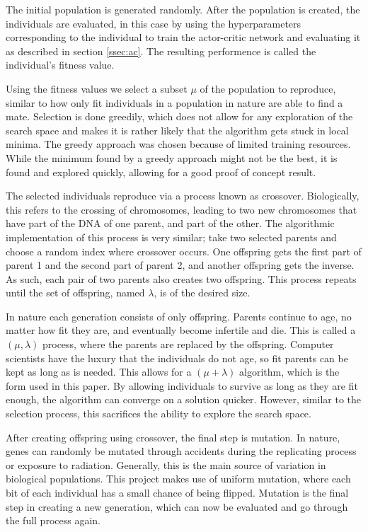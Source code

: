 \documentclass{article}
\begin{document}
The initial population is generated randomly. After the population is created, the individuals are evaluated, in this case by using the hyperparameters corresponding to the individual to train the actor-critic network and evaluating it as described in section \ref{ssec:ac}. The resulting performence is called the individual's fitness value. 

Using the fitness values we select a subset $\mu$ of the population to reproduce, similar to how only fit individuals in a population in nature are able to find a mate. Selection is done greedily, which does not allow for any exploration of the search space and makes it is rather likely that the algorithm gets stuck in local minima. The greedy approach was chosen because of limited training resources. While the minimum found by a greedy approach might not be the best, it is found and explored quickly, allowing for a good proof of concept result. 

The selected individuals reproduce via a process known as crossover. Biologically, this refers to the crossing of chromosomes, leading to two new chromosomes that have part of the DNA of one parent, and part of the other. The algorithmic implementation of this process is very similar; take two selected parents and choose a random index where crossover occurs. One offspring gets the first part of parent 1 and the second part of parent 2, and another offspring gets the inverse. As such, each pair of two parents also creates two offspring. This process repeats until the set of offspring, named $\lambda$, is of the desired size. 

In nature each generation consists of only offspring. Parents continue to age, no matter how fit they are, and eventually become infertile and die. This is called a $(\mu, \lambda)$ process, where the parents are replaced by the offspring. Computer scientists have the luxury that the individuals do not age, so fit parents can be kept as long as is needed. This allows for a $(\mu+\lambda)$ algorithm, which is the form used in this paper. By allowing individuals to survive as long as they are fit enough, the algorithm can converge on a solution quicker. However, similar to the selection process, this sacrifices the ability to explore the search space. 

After creating offspring using crossover, the final step is mutation. In nature, genes can randomly be mutated through accidents during the replicating process or exposure to radiation. Generally, this is the main source of variation in biological populations. This project makes use of uniform mutation, where each bit of each individual has a small chance of being flipped. Mutation is the final step in creating a new generation, which can now be evaluated and go through the full process again. 
\end{document}
